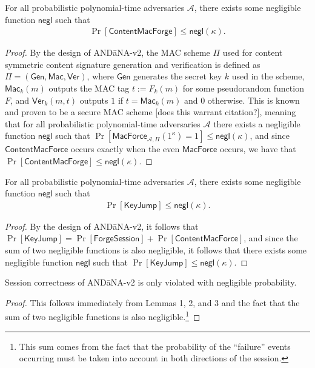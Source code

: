 \begin{lemma}
For all probabilistic polynomial-time adversaries $\mathcal{A}$, there exists some negligible function $\mathsf{negl}$ such that
\begin{align*}
\Pr[\mathsf{ContentMacForge}] \leq \mathsf{negl}(\kappa).
\end{align*}
\end{lemma}
\begin{proof}
By the design of {\sf AND\=aNA-v2}, the MAC scheme $\Pi$ used for content symmetric content signature generation and verification is defined as $\Pi = (\mathsf{Gen}, \mathsf{Mac}, \mathsf{Ver})$, where $\mathsf{Gen}$ generates the secret key $k$ used in the scheme, $\mathsf{Mac}_k(m)$ outputs the MAC tag $t := F_k(m)$ for some pseudorandom function $F$, and $\mathsf{Ver}_k(m, t)$ outputs $1$ if $t = \mathsf{Mac}_k(m)$ and $0$ otherwise. This is known and proven to be a secure MAC scheme [does this warrant citation?], meaning that for all probabilistic polynomial-time adversaries $\mathcal{A}$ there exists a negligible function $\mathsf{negl}$ such that $\Pr[\mathsf{MacForce}_{\mathcal{A},\Pi}(1^{\kappa}) = 1] \leq \mathsf{negl}(\kappa)$, and since $\mathsf{ContentMacForce}$ occurs exactly when the even $\mathsf{MacForce}$ occurs, we have that $\Pr[\mathsf{ContentMacForge}] \leq \mathsf{negl}(\kappa)$.

\end{proof}

\begin{lemma}
For all probabilistic polynomial-time adversaries $\mathcal{A}$, there exists some negligible function $\mathsf{negl}$ such that
\begin{align*}
\Pr[\mathsf{KeyJump}] \leq \mathsf{negl}(\kappa).
\end{align*}
\end{lemma}
\begin{proof}
By the design of {\sf AND\=aNA-v2}, it follows that $\Pr[\mathsf{KeyJump}] = \Pr[\mathsf{ForgeSession}] + \Pr[\mathsf{ContentMacForce}]$, and since the sum of two negligible functions is also negligible, it follows that there exists some negligible function $\mathsf{negl}$ such that $\Pr[\mathsf{KeyJump}] \leq \mathsf{negl}(\kappa)$.
\end{proof}

\begin{thm}
Session correctness of {\sf AND\=aNA-v2} is only violated with negligible probability.
\end{thm}
\begin{proof}
This follows immediately from Lemmas 1, 2, and 3 and the fact that the sum of two negligible functions is also negligible.\footnote{This sum comes from the fact that the probability of the ``failure'' events occurring must be taken into account in both directions of the session.} 
\end{proof}